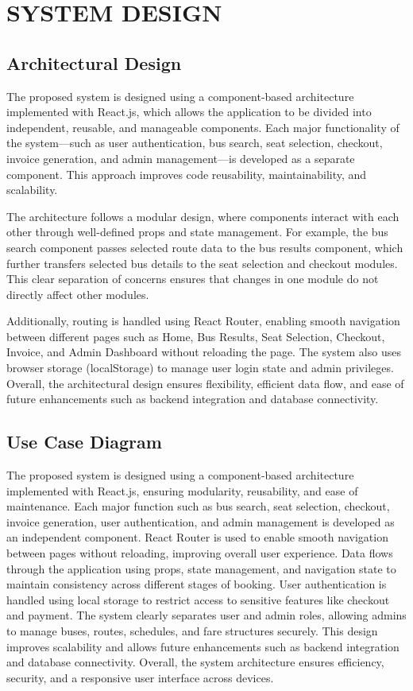 \chapter{SYSTEM DESIGN}

\section{Architectural Design}

The proposed system is designed using a component-based architecture implemented with React.js, which allows the application to be divided into independent, reusable, and manageable components. Each major functionality of the system—such as user authentication, bus search, seat selection, checkout, invoice generation, and admin management—is developed as a separate component. This approach improves code reusability, maintainability, and scalability.

The architecture follows a modular design, where components interact with each other through well-defined props and state management. For example, the bus search component passes selected route data to the bus results component, which further transfers selected bus details to the seat selection and checkout modules. This clear separation of concerns ensures that changes in one module do not directly affect other modules.

Additionally, routing is handled using React Router, enabling smooth navigation between different pages such as Home, Bus Results, Seat Selection, Checkout, Invoice, and Admin Dashboard without reloading the page. The system also uses browser storage (localStorage) to manage user login state and admin privileges. Overall, the architectural design ensures flexibility, efficient data flow, and ease of future enhancements such as backend integration and database connectivity.

\section{Use Case Diagram}

The proposed system is designed using a component-based architecture implemented with React.js, ensuring modularity, reusability, and ease of maintenance. Each major function such as bus search, seat selection, checkout, invoice generation, user authentication, and admin management is developed as an independent component. React Router is used to enable smooth navigation between pages without reloading, improving overall user experience. Data flows through the application using props, state management, and navigation state to maintain consistency across different stages of booking. User authentication is handled using local storage to restrict access to sensitive features like checkout and payment. The system clearly separates user and admin roles, allowing admins to manage buses, routes, schedules, and fare structures securely. This design improves scalability and allows future enhancements such as backend integration and database connectivity. Overall, the system architecture ensures efficiency, security, and a responsive user interface across devices.


